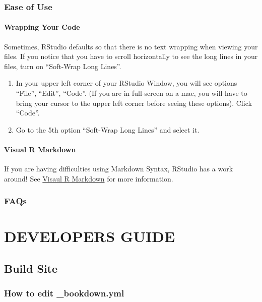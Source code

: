\documentclass[
]{book}
\theoremstyle{definition}
\theoremstyle{definition}
\theoremstyle{definition}
\theoremstyle{definition}
\theoremstyle{remark}
\begin{document}
\section{Ease of Use}\label{ease-of-use}

\subsection{Wrapping Your Code}\label{wrapping-your-code}

Sometimes, RStudio defaults so that there is no text wrapping when viewing your files. If you notice that you have to scroll horizontally to see the long lines in your files, turn on ``Soft-Wrap Long Lines''.

\begin{enumerate}
\def\labelenumi{\arabic{enumi}.}
\item
  In your upper left corner of your RStudio Window, you will see options ``File'', ``Edit'', ``Code''. (If you are in full-screen on a mac, you will have to bring your cursor to the upper left corner before seeing these options). Click ``Code''.
\item
  Go to the 5th option ``Soft-Wrap Long Lines'' and select it.
\end{enumerate}

\subsection{Visual R Markdown}\label{visual-r-markdown}

If you are having difficulties using Markdown Syntax, RStudio has a work around! See \hyperref[visual-r-md]{Visaul R Markdown} for more information.

\section{FAQs}\label{faqs}

\part{DEVELOPERS GUIDE}\label{part-developers-guide}

\chapter{Build Site}\label{build-site}

\section{How to edit \_bookdown.yml}\label{how-to-edit-_bookdown.yml}
\end{document}

